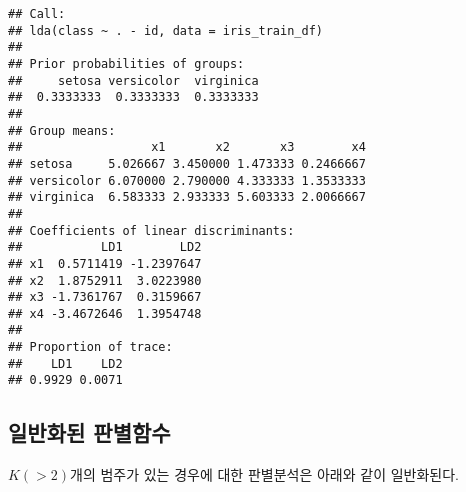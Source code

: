 \documentclass[]{book}
\newenvironment{Shaded}{\begin{snugshade}}{\end{snugshade}}
\newcommand{\DataTypeTok}[1]{\textcolor[rgb]{0.13,0.29,0.53}{#1}}
\newcommand{\DecValTok}[1]{\textcolor[rgb]{0.00,0.00,0.81}{#1}}
\newcommand{\KeywordTok}[1]{\textcolor[rgb]{0.13,0.29,0.53}{\textbf{#1}}}
\newcommand{\NormalTok}[1]{#1}
\newcommand{\OperatorTok}[1]{\textcolor[rgb]{0.81,0.36,0.00}{\textbf{#1}}}
\newcommand{\StringTok}[1]{\textcolor[rgb]{0.31,0.60,0.02}{#1}}
\begin{document}
\begin{Shaded}
\end{Shaded}

\begin{verbatim}
## Call:
## lda(class ~ . - id, data = iris_train_df)
## 
## Prior probabilities of groups:
##     setosa versicolor  virginica 
##  0.3333333  0.3333333  0.3333333 
## 
## Group means:
##                  x1       x2       x3        x4
## setosa     5.026667 3.450000 1.473333 0.2466667
## versicolor 6.070000 2.790000 4.333333 1.3533333
## virginica  6.583333 2.933333 5.603333 2.0066667
## 
## Coefficients of linear discriminants:
##           LD1        LD2
## x1  0.5711419 -1.2397647
## x2  1.8752911  3.0223980
## x3 -1.7361767  0.3159667
## x4 -3.4672646  1.3954748
## 
## Proportion of trace:
##    LD1    LD2 
## 0.9929 0.0071
\end{verbatim}

\hypertarget{mutliclass-generalized-discriminant-function}{%
\subsection{일반화된 판별함수}\label{mutliclass-generalized-discriminant-function}}

\(K (> 2)\)개의 범주가 있는 경우에 대한 판별분석은 아래와 같이 일반화된다.
\end{document}

